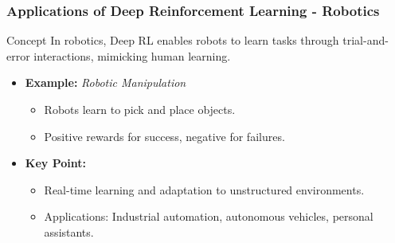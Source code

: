 \documentclass[aspectratio=169]{beamer}
\begin{document}
\begin{frame}[fragile]
  \frametitle{Applications of Deep Reinforcement Learning - Robotics}
  \begin{block}{Concept}
    In robotics, Deep RL enables robots to learn tasks through trial-and-error interactions, mimicking human learning.
  \end{block}
  \begin{itemize}
    \item \textbf{Example:} \textit{Robotic Manipulation}
      \begin{itemize}
        \item Robots learn to pick and place objects.
        \item Positive rewards for success, negative for failures.
      \end{itemize}
    \item \textbf{Key Point:}
      \begin{itemize}
        \item Real-time learning and adaptation to unstructured environments.
        \item Applications: Industrial automation, autonomous vehicles, personal assistants.
      \end{itemize}
  \end{itemize}
\end{frame}
\end{document}
